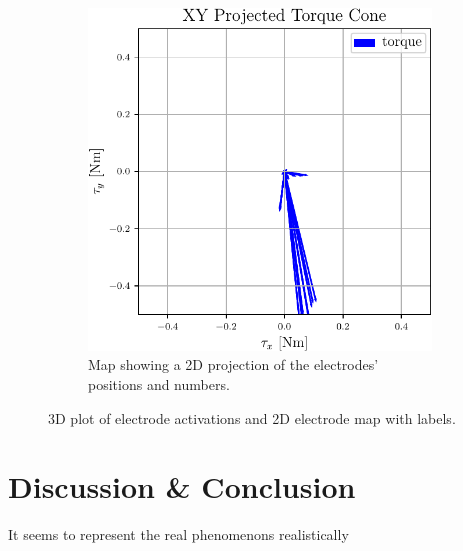 \begin{figure}[h]
\begin{subfigure}[b]{0.48\textwidth}
		\includegraphics[width=\textwidth]{chapters/1-tactile-perception/fig/matplotlib/xy-projected-torque-cones.pdf}
		\caption{Map showing a 2D projection of the electrodes' positions and numbers.}
		\label{fig:electrode-map2}
	\end{subfigure}
		\caption{3D plot of electrode activations and 2D electrode map with labels.}
		\label{fig:flat-contact-experimental-and-electrode-map2}
\end{figure}



\section{Discussion \& Conclusion}\label{sec:1-tactile-perception-discussion-and-conclusion}

It seems to represent the real phenomenons realistically 



